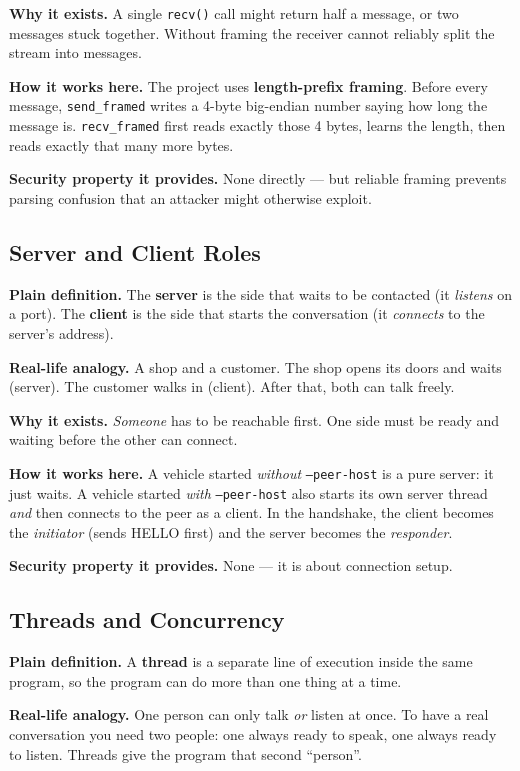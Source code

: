 \documentclass[11pt,a4paper]{report}
\begin{document}
\textbf{Why it exists.} A single \texttt{recv()} call might return half a message,
or two messages stuck together. Without framing the receiver cannot reliably
split the stream into messages.

\textbf{How it works here.} The project uses \textbf{length-prefix framing}.
Before every message, \texttt{send\_framed} writes a 4-byte big-endian number
saying how long the message is. \texttt{recv\_framed} first reads exactly those
4 bytes, learns the length, then reads exactly that many more bytes.

\textbf{Security property it provides.} None directly --- but reliable framing
prevents parsing confusion that an attacker might otherwise exploit.

\subsection{Server and Client Roles}
\textbf{Plain definition.} The \textbf{server} is the side that waits to be
contacted (it \emph{listens} on a port). The \textbf{client} is the side that
starts the conversation (it \emph{connects} to the server's address).

\textbf{Real-life analogy.} A shop and a customer. The shop opens its doors and
waits (server). The customer walks in (client). After that, both can talk freely.

\textbf{Why it exists.} \emph{Someone} has to be reachable first. One side must
be ready and waiting before the other can connect.

\textbf{How it works here.} A vehicle started \emph{without} \texttt{--peer-host}
is a pure server: it just waits. A vehicle started \emph{with}
\texttt{--peer-host} also starts its own server thread \emph{and} then connects
to the peer as a client. In the handshake, the client becomes the
\emph{initiator} (sends HELLO first) and the server becomes the
\emph{responder}.

\textbf{Security property it provides.} None --- it is about connection setup.

\subsection{Threads and Concurrency}
\textbf{Plain definition.} A \textbf{thread} is a separate line of execution
inside the same program, so the program can do more than one thing at a time.

\textbf{Real-life analogy.} One person can only talk \emph{or} listen at once. To
have a real conversation you need two people: one always ready to speak, one
always ready to listen. Threads give the program that second ``person''.
\end{document}

